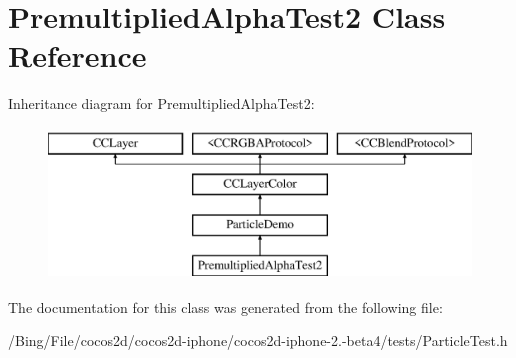 \hypertarget{interface_premultiplied_alpha_test2}{\section{Premultiplied\-Alpha\-Test2 Class Reference}
\label{interface_premultiplied_alpha_test2}
}
Inheritance diagram for Premultiplied\-Alpha\-Test2\-:\begin{figure}[H]
\begin{center}
\leavevmode
\includegraphics[height=4.000000cm]{interface_premultiplied_alpha_test2}
\end{center}
\end{figure}


The documentation for this class was generated from the following file\-:\begin{DoxyCompactItemize}
\item 
/\-Bing/\-File/cocos2d/cocos2d-\/iphone/cocos2d-\/iphone-\/2.-\/beta4/tests/Particle\-Test.\-h\end{DoxyCompactItemize}

